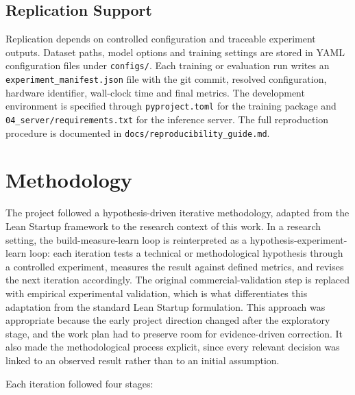\subsection{Replication Support}

Replication depends on controlled configuration and traceable experiment outputs. Dataset paths,
model options and training settings are stored in YAML configuration files under \texttt{configs/}.
Each training or evaluation run writes an \texttt{experiment\_manifest.json} file with the git
commit, resolved configuration, hardware identifier, wall-clock time and final metrics. The
development environment is specified through \texttt{pyproject.toml} for the training package and
\texttt{04\_server/requirements.txt} for the inference server. The full reproduction procedure is
documented in \texttt{docs/reproducibility\_guide.md}.

\section{Methodology}
\label{sec:plan_methodology}

The project followed a hypothesis-driven iterative methodology, adapted from the Lean Startup
framework \cite{ries2011lean} to the research context of this work. In a research setting, the
build-measure-learn loop is reinterpreted as a hypothesis-experiment-learn loop: each iteration
tests a technical or methodological hypothesis through a controlled experiment, measures the result
against defined metrics, and revises the next iteration accordingly. The original
commercial-validation step is replaced with empirical experimental validation, which is what
differentiates this adaptation from the standard Lean Startup formulation. This approach was
appropriate because the early project direction changed after the exploratory stage, and the work
plan had to preserve room for evidence-driven correction. It also made the methodological process
explicit, since every relevant decision was linked to an observed result rather than to an initial
assumption.

Each iteration followed four stages:

